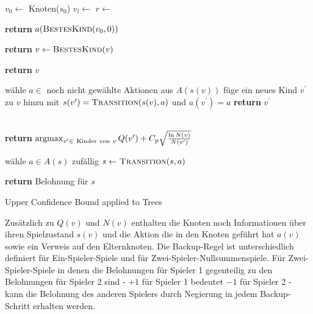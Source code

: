\begin{algorithm}[H]
\begin{algorithmic}[1]
	\State $v_0\gets$ Knoten($s_0$)
		\State $v_l\gets$ 
		\State $r\gets$ 
		\State {}
	\EndWhile 
	
\State \textbf{return} $a(\Call{BestesKind}{v_0,0})$
\EndFunction

			\State \textbf{return} 
		\Else
			\State $v \gets \textsc{BestesKind}(v)$
		\EndIf
	\EndWhile
	 
	\State \textbf{return} $v$
\EndFunction

	\State wähle $a \in$ noch nicht gewählte Aktionen aus $A(s(v))$
	\State füge ein neues Kind $v^\prime$ zu $v$ hinzu
	\State mit $s(v^\prime) = \textsc{Transition}(s(v),a)$
		\State und $a(v^\prime) = a$
		\State \textbf{return} $v^\prime$
\EndFunction

\\
\State \textbf{return} $\operatorname*{argmax}_{v^\prime \in\ \text{Kinder von}\ v} Q(v^\prime) + C_p \sqrt{\frac{\ln N(v)}{N(v^\prime)}}$
\EndFunction

\State wähle $a \in A(s)$ zufällig
\State $s \gets \textsc{Transition}(s,a)$
\EndWhile

\State \textbf{return} Belohnung für $s$
\EndFunction
\end{algorithmic}
\caption{Upper Confidence Bound applied to Trees\footnotemark}
\label{algo:UCT}
\end{algorithm}

Zusätzlich zu $Q(v)$ und $N(v)$ enthalten die Knoten noch Informationen über ihren Spielzustand $s(v)$ und die Aktion die in den Knoten geführt hat $a(v)$ sowie ein Verweis auf den Elternknoten. Die Backup-Regel ist unterschiedlich definiert für Ein-Spieler-Spiele und für Zwei-Spieler-Nullsummenspiele. Für Zwei-Spieler-Spiele in denen die Belohnungen für Spieler 1 gegenteilig zu den Belohnungen für Spieler 2 sind - $+1$ für Spieler 1 bedeutet $-1$ für Spieler 2 - kann die Belohnung des anderen Spielers durch Negierung in jedem Backup-Schritt erhalten werden.


